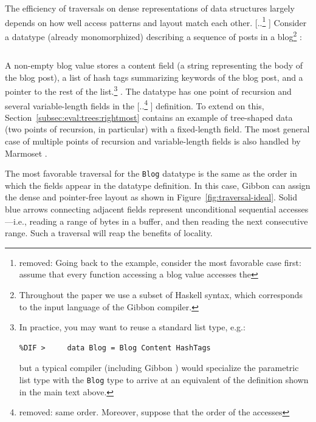 \documentclass[acmsmall,review,anonymous]{acmart}\settopmatter{printfolios=true,printccs=false,printacmref=false}
\newcommand{\secref}[1]{Section~\ref{#1}}
\newcommand{\Secref}[1]{\secref{#1}}
\newcommand{\system}{{\sc Marmoset}\xspace}
\newcommand{\gibbon}{{\sc Gibbon}\xspace}
\providecommand{\DIFaddtex}[1]{{\protect\color{blue} \sf #1}} %
\providecommand{\DIFdeltex}[1]{{\protect\color{red} [..\footnote{removed: #1} ]}} %
\providecommand{\DIFaddbegin}{} %
\providecommand{\DIFaddend}{} %
\providecommand{\DIFdelbegin}{} %
\providecommand{\DIFdelend}{} %
\providecommand{\DIFmodbegin}{} %
\providecommand{\DIFmodend}{} %
\providecommand{\DIFadd}[1]{\texorpdfstring{\DIFaddtex{#1}}{#1}} %
\providecommand{\DIFdel}[1]{\texorpdfstring{\DIFdeltex{#1}}{}} %
\newcommand{\DIFscaledelfig}{0.5}
\newlength{\DIFdelgraphicswidth} %
\newlength{\DIFdelgraphicsheight} %
\newcommand{\DIFaddincludegraphics}[2][]{{\color{blue}\fbox{\DIFOincludegraphics[#1]{#2}}}} %
\newcommand{\DIFdelincludegraphics}[2][]{%
\sbox{\DIFdelgraphicsbox}{\DIFOincludegraphics[#1]{#2}}%
\settoboxwidth{\DIFdelgraphicswidth}{\DIFdelgraphicsbox} %
\settoboxtotalheight{\DIFdelgraphicsheight}{\DIFdelgraphicsbox} %
\scalebox{\DIFscaledelfig}{%
\parbox[b]{\DIFdelgraphicswidth}{\usebox{\DIFdelgraphicsbox}\\[-\baselineskip] \rule{\DIFdelgraphicswidth}{0em}}\llap{\resizebox{\DIFdelgraphicswidth}{\DIFdelgraphicsheight}{%
\setlength{\unitlength}{\DIFdelgraphicswidth}%
\begin{picture}(1,1)%
\thicklines\linethickness{2pt} %
{\color[rgb]{1,0,0}\put(0,0){\framebox(1,1){}}}%
{\color[rgb]{1,0,0}\put(0,0){\line( 1,1){1}}}%
{\color[rgb]{1,0,0}\put(0,1){\line(1,-1){1}}}%
\end{picture}%
}\hspace*{3pt}}} %
} %
\DeclareRobustCommand{\DIFaddbegin}{\DIFOaddbegin \let\includegraphics\DIFaddincludegraphics} %
\DeclareRobustCommand{\DIFaddend}{\DIFOaddend \let\includegraphics\DIFOincludegraphics} %
\DeclareRobustCommand{\DIFdelbegin}{\DIFOdelbegin \let\includegraphics\DIFdelincludegraphics} %
\DeclareRobustCommand{\DIFdelend}{\DIFOaddend \let\includegraphics\DIFOincludegraphics} %
\begin{document}
\DIFaddend The efficiency of traversals on dense representations of data structures
largely depends on how well access patterns and layout match each other.
\DIFdelbegin \DIFdel{Going back to the example, consider the most favorable case first:
assume that every function accessing a blog value
accesses the }\DIFdelend \DIFaddbegin \DIFadd{Consider a datatype (already monomorphized) describing
a sequence of posts in a blog}\footnote{\DIFadd{Throughout the paper we use a subset of Haskell syntax, which
corresponds to the input language of the }\gibbon \DIFadd{compiler.}}\DIFadd{:
}\DIFmodbegin
\begin{lstlisting}[alsolanguage=DIFcode]
%DIF >     data BlogList = Nil | Blog Content HashTags BlogList
\end{lstlisting}
\DIFmodend
\DIFadd{A non-empty blog value stores a content field (a
string representing the body of the blog post), a list of hash tags
summarizing keywords of the blog post, and a pointer to the rest of
the list.}\footnote{\DIFadd{In practice, you may want to reuse a standard list type, e.g.:
  }\DIFmodbegin
\begin{lstlisting}[alsolanguage=DIFcode]
%DIF >     type BlogList = [Blog]
%DIF >     data Blog = Blog Content HashTags
\end{lstlisting}
\DIFmodend
  \DIFadd{but a typical compiler (including
  }\gibbon\DIFadd{) would specialize the parametric list type with the }{\color{blue}%
\lstinline|Blog|
}%
\DIFadd{type to arrive at an equivalent of the definition shown in the main text
  above.}}\DIFadd{. The datatype has one point of recursion and several variable-length }\DIFaddend fields in
the \DIFdelbegin \DIFdel{same order. Moreover, suppose that the order of the accesses }\DIFdelend \DIFaddbegin \DIFadd{definition. To extend on this, \Secref{subsec:eval:trees:rightmost} contains
an example of tree-shaped data (two points of recursion, in particular) with a
fixed-length field. The most general case of multiple points of recursion and
variable-length fields is also handled by }\system\DIFadd{.
}

\DIFadd{The most favorable traversal for the }{\color{blue}%
\lstinline|Blog| %
}%
\DIFadd{datatype
}\DIFaddend is the same as the order in
which the fields appear in the datatype definition. In this case, \gibbon{} can
assign the dense and pointer-free layout as shown in Figure~\ref{fig:traversal-ideal}.
Solid blue arrows connecting adjacent fields represent unconditional sequential
accesses---i.e., reading a range of bytes in a buffer, and then reading the next
consecutive range.
Such a traversal will reap the benefits of locality.
\end{document}
